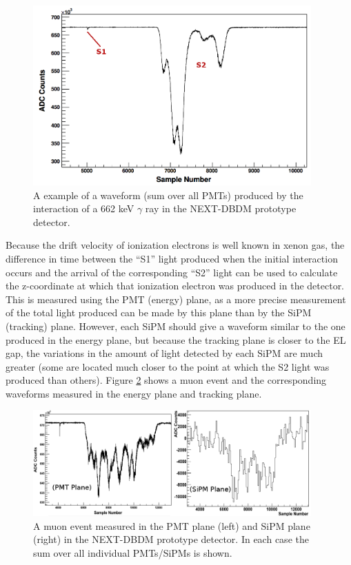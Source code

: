 \documentclass[10pt]{article}
\begin{document}
\begin{figure}[!htb]
	\centering
	\includegraphics[width= 0.95\textwidth]{fig/example_PMT_waveform.png}
	\caption{A example of a waveform (sum over all PMTs) produced by the interaction of a 662 keV $\gamma$ ray in the NEXT-DBDM prototype detector.} \label{fig_PMTwaveform}
\end{figure}

\noindent Because the drift velocity of ionization electrons is well known in xenon gas, the difference in time between the ``S1'' light produced when the initial interaction occurs and the arrival of 
the corresponding ``S2'' light can be used to calculate the z-coordinate at which that
ionization electron was produced in the detector.  This is measured using the PMT (energy) plane, as a more precise measurement of the total light produced can be made by this plane than by
the SiPM (tracking) plane.  However, each SiPM should give a waveform similar to the one produced in the energy plane, but because the tracking plane is closer to the EL gap, the variations in the
amount of light detected by each SiPM are much greater (some are located much closer to the point at which the S2 light was produced than others).  Figure \ref{fig_PMTandSiPM} shows a muon event and the
corresponding waveforms measured in the energy plane and tracking plane.\\

\begin{figure}[!htb]
	\centering
	\includegraphics[width= 0.95\textwidth]{fig/c3_fig_sum_waveforms.png}
	\caption{A muon event measured in the PMT plane (left) and SiPM plane (right) in the NEXT-DBDM prototype detector.  In each case the sum over all individual PMTs/SiPMs is shown.}\label{fig_PMTandSiPM}
\end{figure}
\end{document}
